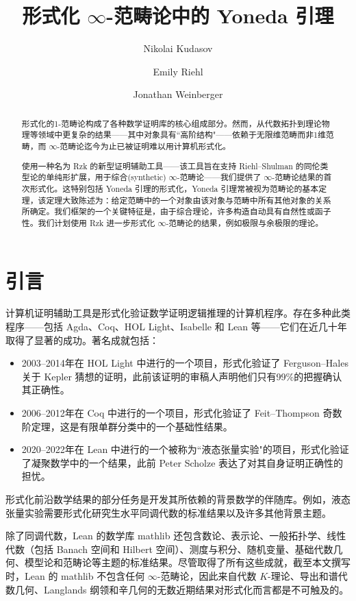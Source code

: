 \documentclass[12pt,a4paper]{article}
\title{形式化 $\infty$-范畴论中的 Yoneda 引理}
\author{Nikolai Kudasov \and Emily Riehl \and Jonathan Weinberger}
\date{}
\theoremstyle{definition}
\theoremstyle{definition}
\begin{document}
\maketitle

\begin{abstract}
形式化的1-范畴论构成了各种数学证明库的核心组成部分。然而，从代数拓扑到理论物理等领域中更复杂的结果——其中对象具有``高阶结构"——依赖于无限维范畴而非1维范畴，而 $\infty$-范畴论迄今为止已被证明难以用计算机形式化。

使用一种名为 Rzk 的新型证明辅助工具——该工具旨在支持 Riehl--Shulman 的同伦类型论的单纯形扩展，用于综合(synthetic) $\infty$-范畴论——我们提供了 $\infty$-范畴论结果的首次形式化。这特别包括 Yoneda 引理的形式化，Yoneda 引理常被视为范畴论的基本定理，该定理大致陈述为：给定范畴中的一个对象由该对象与范畴中所有其他对象的关系所确定。我们框架的一个关键特征是，由于综合理论，许多构造自动具有自然性或函子性。我们计划使用 Rzk 进一步形式化 $\infty$-范畴论的结果，例如极限与余极限的理论。
\end{abstract}

\section{引言}

计算机证明辅助工具是形式化验证数学证明逻辑推理的计算机程序。存在多种此类程序——包括 Agda、Coq、HOL Light、Isabelle 和 Lean 等——它们在近几十年取得了显著的成功。著名成就包括：
\begin{itemize}
    \item 2003--2014年在 HOL Light 中进行的一个项目，形式化验证了 Ferguson--Hales 关于 Kepler 猜想的证明，此前该证明的审稿人声明他们只有99\%的把握确认其正确性。
    \item 2006--2012年在 Coq 中进行的一个项目，形式化验证了 Feit--Thompson 奇数阶定理，这是有限单群分类中的一个基础性结果。
    \item 2020--2022年在 Lean 中进行的一个被称为``液态张量实验"的项目，形式化验证了凝聚数学中的一个结果，此前 Peter Scholze 表达了对其自身证明正确性的担忧。
\end{itemize}

形式化前沿数学结果的部分任务是开发其所依赖的背景数学的伴随库。例如，液态张量实验需要形式化研究生水平同调代数的标准结果以及许多其他背景主题。

除了同调代数，Lean 的数学库 mathlib 还包含数论、表示论、一般拓扑学、线性代数（包括 Banach 空间和 Hilbert 空间）、测度与积分、随机变量、基础代数几何、模型论和范畴论等主题的标准结果。尽管取得了所有这些成就，截至本文撰写时，Lean 的 mathlib 不包含任何 $\infty$-范畴论，因此来自代数 $K$-理论、导出和谱代数几何、Langlands 纲领和辛几何的无数近期结果对形式化而言都是不可触及的。
\end{document}
